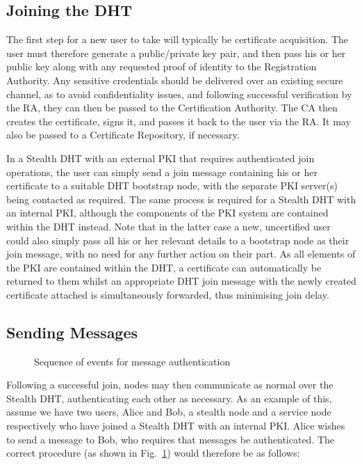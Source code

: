 \documentclass{elsart3p}
\begin{document}
\subsection{Joining the DHT}

The first step for a new user to take will typically be certificate
acquisition. The user must therefore generate a public/private key
pair, and then pass his or her public key along with any requested
proof of identity to the Registration Authority. Any sensitive
credentials should be delivered over an existing secure channel, as
to avoid confidentiality issues, and following successful
verification by the RA, they can then be passed to the Certification
Authority. The CA then creates the certificate, signs it, and passes
it back to the user via the RA. It may also be passed to a
Certificate Repository, if necessary.

In a Stealth DHT with an external PKI that requires authenticated
join operations, the user can simply send a join message containing
his or her certificate to a suitable DHT bootstrap node, with the
separate PKI server(s) being contacted as required. The same process
is required for a Stealth DHT with an internal PKI, although the
components of the PKI system are contained within the DHT instead.
Note that in the latter case a new, uncertified user could also
simply pass all his or her relevant details to a bootstrap node as
their join message, with no need for any further action on their
part. As all elements of the PKI are contained within the DHT, a
certificate can automatically be returned to them whilst an
appropriate DHT join message with the newly created certificate
attached is simultaneously forwarded, thus minimising join delay.


\subsection{Sending Messages}
\label{subsect-communicate}
\begin{figure}[tb]
\centering
{}
\caption{Sequence of events for message authentication}
\label{fig:alicebob}
\end{figure}

Following a successful join, nodes may then communicate as normal
over the Stealth DHT, authenticating each other as necessary. As an
example of this, assume we have two users, Alice and Bob, a stealth
node and a service node respectively who have joined a Stealth DHT
with an internal PKI. Alice wishes to send a message to Bob,
who requires that messages be authenticated. The correct procedure
(as shown in Fig.~\ref{fig:alicebob}) would therefore be as follows:
\end{document}

